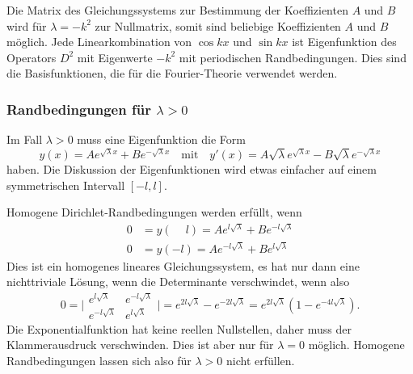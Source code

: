 Die Matrix des Gleichungssystems zur Bestimmung der Koeffizienten $A$ und $B$
wird für $\lambda=-k^2$ zur Nullmatrix, somit sind beliebige Koeffizienten
$A$ und $B$ möglich.
Jede Linearkombination von $\cos kx$ und $\sin kx$ ist Eigenfunktion
des Operators $D^2$ mit Eigenwerte $-k^2$ mit periodischen Randbedingungen.
Dies sind die Basisfunktionen, die für die Fourier-Theorie verwendet
werden.

%
%
\subsubsection{Randbedingungen für $\lambda > 0$}
Im Fall $\lambda >0$ muss eine Eigenfunktion die Form
\[
y(x)
=
Ae^{\!\sqrt{\lambda}x}
+
Be^{-\!\sqrt{\lambda}x}
\quad\text{mit}\quad
y'(x)
=
A\!\sqrt{\lambda}e^{\!\sqrt{\lambda}x}
-
B\!\sqrt{\lambda}e^{-\!\sqrt{\lambda}x}
\]
haben.
Die Diskussion der Eigenfunktionen wird etwas einfacher auf einem
symmetrischen Intervall $[-l,l]$.

Homogene Dirichlet-Randbedingungen werden erfüllt, wenn
\begin{align*}
0&=y(\phantom{-}l) = Ae^{l\!\sqrt{\lambda}} + Be^{-l\!\sqrt{\lambda}}
\\
0&=y(         - l) = Ae^{-l\!\sqrt{\lambda}} + Be^{l\!\sqrt{\lambda}}
\end{align*}
Dies ist ein homogenes lineares Gleichungssystem, es hat nur dann eine
nichttriviale Lösung, wenn die Determinante verschwindet, wenn also
\[
0
=
\biggl|
\begin{matrix}
e^{l\!\sqrt{\lambda}}  & e^{-l\!\sqrt{\lambda}} \\
e^{-l\!\sqrt{\lambda}} & e^{l\!\sqrt{\lambda}}
\end{matrix}
\biggr|
=
e^{2l\!\sqrt{\lambda}} - e^{-2l\!\sqrt{\lambda}}
=
e^{2l\!\sqrt{\lambda}} ( 1 - e^{-4l\!\sqrt{\lambda}}).
\]
Die Exponentialfunktion hat keine reellen Nullstellen, daher
muss der Klammerausdruck verschwinden.
Dies ist aber nur für $\lambda=0$ möglich.
Homogene Randbedingungen lassen sich also für $\lambda>0$ nicht erfüllen.

